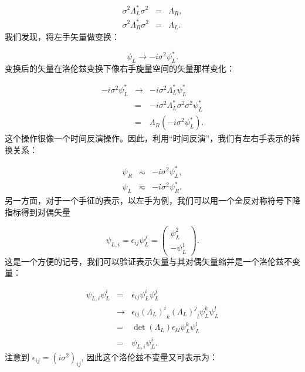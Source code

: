 \documentclass[10pt,UTF8]{ctexart}
\begin{document}
\begin{eqnarray}
\sigma^{2}\Lambda_{L}^{*}\sigma^{2} & = & \Lambda_{R},\\
\sigma^{2}\Lambda_{R}^{*}\sigma^{2} & = & \Lambda_{L}.
\end{eqnarray}
我们发现，将左手矢量做变换：

\begin{equation}
\psi_{L}\rightarrow-i\sigma^{2}\psi_{L}^{*}.
\end{equation}
变换后的矢量在洛伦兹变换下像右手旋量空间的矢量那样变化：

\begin{eqnarray}
-i\sigma^{2}\psi_{L}^{*} & \rightarrow & -i\sigma^{2}\Lambda_{L}^{*}\psi_{L}^{*}\nonumber \\
 & = & -i\sigma^{2}\Lambda_{L}^{*}\sigma^{2}\sigma^{2}\psi_{L}^{*}\nonumber \\
 & = & \Lambda_{R}\left(-i\sigma^{2}\psi_{L}^{*}\right).
\end{eqnarray}
这个操作很像一个时间反演操作。因此，利用“时间反演”，我们有左右手表示的转换关系：

\begin{eqnarray}
\psi_{R} & \eqsim & -i\sigma^{2}\psi_{L}^{*},\\
\psi_{L} & \eqsim & -i\sigma^{2}\psi_{R}^{*}.
\end{eqnarray}
另一方面，对于一个手征的表示，以左手为例，我们可以用一个全反对称符号下降指标得到对偶矢量

\begin{equation}
\psi_{L,i}=\epsilon_{ij}\psi_{L}^{j}=\left(\begin{array}{c}
\psi_{L}^{2}\\
-\psi_{L}^{1}
\end{array}\right).
\end{equation}
这是一个方便的记号，我们可以验证表示矢量与其对偶矢量缩并是一个洛伦兹不变量：

\begin{eqnarray}
\psi_{L,i}\psi_{L}^{i} & = & \epsilon_{ij}\psi_{L}^{i}\psi_{L}^{j}\nonumber \\
 & \rightarrow & \epsilon_{ij}{\left(\Lambda_{L}\right)^{i}}_{k}{\left(\Lambda_{L}\right)^{j}}_{l}\psi_{L}^{k}\psi_{L}^{l}\nonumber \\
 & = & \det\left(\Lambda_{L}\right)\epsilon_{kl}\psi_{L}^{k}\psi_{L}^{l}\nonumber \\
 & = & \psi_{L,i}\psi_{L}^{i}.
\end{eqnarray}
注意到 $\epsilon_{ij}=\left(i\sigma^{2}\right)_{ij}$, 因此这个洛伦兹不变量又可表示为：
\end{document}
